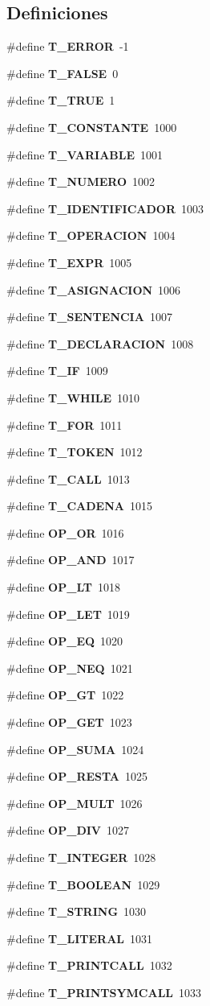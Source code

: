 \subsection*{Definiciones}
\begin{CompactItemize}
\item 
\#define {\bf T\_\-ERROR}~-1
\item 
\#define {\bf T\_\-FALSE}~0
\item 
\#define {\bf T\_\-TRUE}~1
\item 
\#define {\bf T\_\-CONSTANTE}~1000
\item 
\#define {\bf T\_\-VARIABLE}~1001
\item 
\#define {\bf T\_\-NUMERO}~1002
\item 
\#define {\bf T\_\-IDENTIFICADOR}~1003
\item 
\#define {\bf T\_\-OPERACION}~1004
\item 
\#define {\bf T\_\-EXPR}~1005
\item 
\#define {\bf T\_\-ASIGNACION}~1006
\item 
\#define {\bf T\_\-SENTENCIA}~1007
\item 
\#define {\bf T\_\-DECLARACION}~1008
\item 
\#define {\bf T\_\-IF}~1009
\item 
\#define {\bf T\_\-WHILE}~1010
\item 
\#define {\bf T\_\-FOR}~1011
\item 
\#define {\bf T\_\-TOKEN}~1012
\item 
\#define {\bf T\_\-CALL}~1013
\item 
\#define {\bf T\_\-CADENA}~1015
\item 
\#define {\bf OP\_\-OR}~1016
\item 
\#define {\bf OP\_\-AND}~1017
\item 
\#define {\bf OP\_\-LT}~1018
\item 
\#define {\bf OP\_\-LET}~1019
\item 
\#define {\bf OP\_\-EQ}~1020
\item 
\#define {\bf OP\_\-NEQ}~1021
\item 
\#define {\bf OP\_\-GT}~1022
\item 
\#define {\bf OP\_\-GET}~1023
\item 
\#define {\bf OP\_\-SUMA}~1024
\item 
\#define {\bf OP\_\-RESTA}~1025
\item 
\#define {\bf OP\_\-MULT}~1026
\item 
\#define {\bf OP\_\-DIV}~1027
\item 
\#define {\bf T\_\-INTEGER}~1028
\item 
\#define {\bf T\_\-BOOLEAN}~1029
\item 
\#define {\bf T\_\-STRING}~1030
\item 
\#define {\bf T\_\-LITERAL}~1031
\item 
\#define {\bf T\_\-PRINTCALL}~1032
\item 
\#define {\bf T\_\-PRINTSYMCALL}~1033
\end{CompactItemize}


